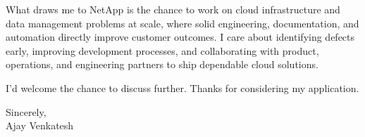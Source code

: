 \documentclass[letterpaper,11pt]{article}
\begin{document}
What draws me to NetApp is the chance to work on cloud infrastructure and data management problems at scale, where solid engineering, documentation, and automation directly improve customer outcomes. I care about identifying defects early, improving development processes, and collaborating with product, operations, and engineering partners to ship dependable cloud solutions.

I'd welcome the chance to discuss further. Thanks for considering my application.

\vspace{12pt}
Sincerely, \\
Ajay Venkatesh
\end{document}
